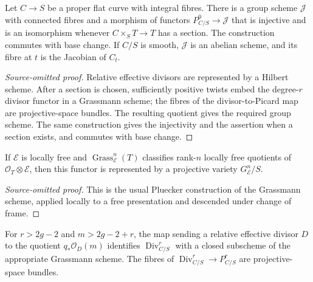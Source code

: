 \begin{theorem}
\label{thm:milne-relative-jacobian-source}

Let $C\to S$ be a proper flat curve with integral fibres.  There
is a group scheme $\mathcal J$ with connected fibres and a morphism of functors
$P^0_{C/S}\to\mathcal J$ that is injective and is an isomorphism whenever
$C\times_S T\to T$ has a section.  The construction commutes with base change.
If $C/S$ is smooth, $\mathcal J$ is an abelian scheme, and its fibre at $t$ is
the Jacobian of $C_t$.
\end{theorem}

\begin{proof}[Source-omitted proof]

Relative effective divisors are represented by a Hilbert scheme.  After a
section is chosen, sufficiently positive twists embed the degree-$r$ divisor
functor in a Grassmann scheme; the fibres of the divisor-to-Picard map are
projective-space bundles.  The resulting quotient gives the required group
scheme.  The same construction gives the injectivity and the assertion when a
section exists, and commutes with base change.

\end{proof}


\begin{proposition}
\label{prop:milne-grassmann-representability-source}

If $\mathcal E$ is locally free and $\operatorname{Grass}_{\mathcal E}^n(T)$
classifies rank-$n$ locally free quotients of $\mathcal O_T\otimes\mathcal E$,
then this functor is represented by a projective variety $G_{\mathcal E}^n/S$.
\end{proposition}

\begin{proof}[Source-omitted proof]

This is the usual Pluecker construction of the Grassmann scheme, applied
locally to a free presentation and descended under change of frame.

\end{proof}


\begin{proposition}
\label{prop:milne-relative-divisors-grassmann-source}

For $r>2g-2$ and $m>2g-2+r$, the map sending a relative effective divisor
$D$ to the quotient $q_*\mathcal O_D(m)$ identifies $\operatorname{Div}^r_{C/S}$
with a closed subscheme of the appropriate Grassmann scheme.  The fibres of
$\operatorname{Div}^r_{C/S}\to P^r_{C/S}$ are projective-space bundles.
\end{proposition}

